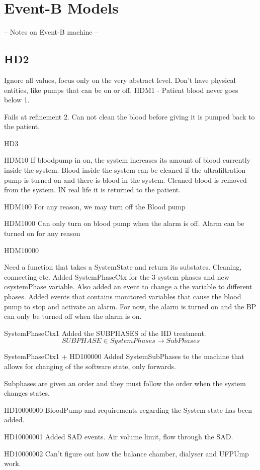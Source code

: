 \section{Event-B Models}
-- Notes on Event-B machine --

\subsection{HD2}
Ignore all values, focus only on the very abstract level. Don't have physical entities, like pumps that can be on or off.
HDM1 - Patient blood never goes below 1.


Fails at refinement 2. Can not clean the blood before giving it is pumped back to the patient.

HD3

HDM10
If bloodpump in on, the system increases its amount of blood currently inside the system.
Blood inside the system can be cleaned if the ultrafiltration pump is turned on and there is blood in the system.
Cleaned blood is removed from the system. IN real life it is returned to the patient. 

HDM100
For any reason, we may turn off the Blood pump

HDM1000
Can only turn on blood pump when the alarm is off.
Alarm can be turned on for any reason

HDM10000

Need a function that takes a SystemState and return its substates. Cleaning, connecting etc.
Added SystemPhaseCtx for the 3 system phases and new csystemPhase variable. Also added an event to change a the variable to different phases.
Added events that contains monitored variables that cause the blood pump to stop and activate an alarm. For now, the alarm is turned on and the BP can only be turned off when the alarm is on.


SystemPhaseCtx1
Added the SUBPHASES of the HD treatment. $$ SUBPHASE \in SystemPhases \longrightarrow SubPhases $$


SystemPhaseCtx1 + HD100000
Added SystemSubPhases to the machine that allows for changing of the software state, only forwards.

Subphases are given an order and they must follow the order when the system changes states.


HD10000000
BloodPump and requirements regarding the System state has been added. 


HD10000001
Added SAD events. Air volume limit, flow through the SAD. 

HD10000002
Can't figure out how the balance chamber, dialyser and UFPUmp work. 















